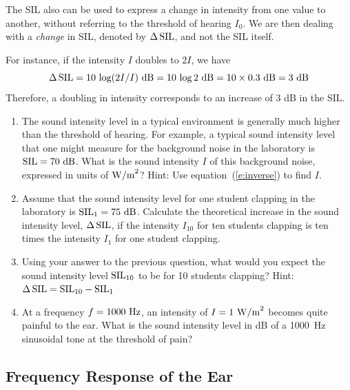 \documentclass[11pt]{NSF}
\def\be{\begin{equation}}
\def\ee{\end{equation}}
\def\ben{\begin{enumerate}}
\def\een{\end{enumerate}}
\begin{document}
The SIL also can be used to express a change in intensity from one 
value to another, without referring to the threshold of hearing $I_0$. 
We are then dealing with a {\em change} in SIL, denoted by 
$\Delta\,{\rm SIL}$, and not the SIL itself. 

For instance, if the intensity $I$ doubles to $2I$, we have
%
\be
\Delta\,{\rm SIL} = 10\,\log (2I/I)~{\rm dB}
= 10\,\log 2~{\rm dB} 
= 10\times 0.3~{\rm dB} 
= 3~{\rm dB}
\ee
Therefore, a doubling in intensity corresponds to an increase of 3 dB in the SIL.

\ben

\item
The sound intensity level in a typical environment is generally much higher 
than the threshold of hearing. 
For example, a typical sound intensity level that one might measure
for the background noise in the laboratory is ${\rm SIL}=70~{\rm dB}$.
What is the sound intensity $I$ of this background noise, expressed in 
units of ${\rm W/m}^2$? Hint: Use equation~(\ref{e:inverse}) to find $I$.

\item 
Assume that the sound intensity level for one student clapping in the
laboratory is ${\rm SIL}_1=75~{\rm dB}$. 
Calculate the theoretical increase in the sound intensity level,
$\Delta\,{\rm SIL}$, if the intensity $I_{10}$ for ten students clapping 
is ten times the intensity $I_1$ for one student clapping.

\item 
Using your answer to the previous question, what would you expect 
the sound intensity level ${\rm SIL}_{10}$ to be for 10 students 
clapping?
Hint: $\Delta\,{\rm SIL} = {\rm SIL}_{10}- {\rm SIL}_1$

\item 
At a frequency $f =1000~{\rm Hz}$, an intensity of $I = 1~{\rm W/m}^2$ 
becomes quite painful to the ear.
What is the sound intensity level in dB of a 1000~Hz sinusoidal 
tone at the threshold of pain?

\een

\subsection{Frequency Response of the Ear}
\end{document}
